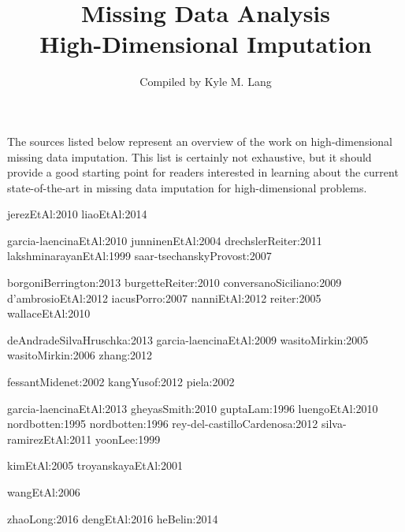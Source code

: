 \documentclass[12pt]{article}
\title{Missing Data Analysis\\ \Large High-Dimensional Imputation}
\author{Compiled by Kyle M. Lang}
\begin{document}
\maketitle

The sources listed below represent an overview of the work on high-dimensional
missing data imputation. This list is certainly not exhaustive, but it should
provide a good starting point for readers interested in learning about the
current state-of-the-art in missing data imputation for high-dimensional
problems.

jerezEtAl:2010
liaoEtAl:2014

garcia-laencinaEtAl:2010
junninenEtAl:2004
drechslerReiter:2011
lakshminarayanEtAl:1999
saar-tsechanskyProvost:2007

borgoniBerrington:2013
burgetteReiter:2010
conversanoSiciliano:2009
d'ambrosioEtAl:2012
iacusPorro:2007
nanniEtAl:2012
reiter:2005
wallaceEtAl:2010

deAndradeSilvaHruschka:2013
garcia-laencinaEtAl:2009
wasitoMirkin:2005
wasitoMirkin:2006
zhang:2012

fessantMidenet:2002
kangYusof:2012
piela:2002

garcia-laencinaEtAl:2013
gheyasSmith:2010
guptaLam:1996
luengoEtAl:2010
nordbotten:1995
nordbotten:1996
rey-del-castilloCardenosa:2012
silva-ramirezEtAl:2011
yoonLee:1999

kimEtAl:2005
troyanskayaEtAl:2001

wangEtAl:2006

zhaoLong:2016
dengEtAl:2016
heBelin:2014





\end{document}
